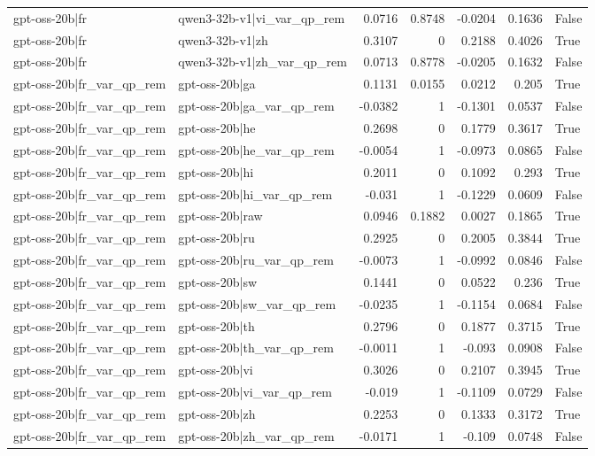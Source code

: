 \begin{table}
\begin{tabular}{l l r r r r l}
gpt-oss-20b|fr & qwen3-32b-v1|vi_var_qp_rem & 0.0716 & 0.8748 & -0.0204 & 0.1636 & False \\
gpt-oss-20b|fr & qwen3-32b-v1|zh & 0.3107 & 0 & 0.2188 & 0.4026 & True \\
gpt-oss-20b|fr & qwen3-32b-v1|zh_var_qp_rem & 0.0713 & 0.8778 & -0.0205 & 0.1632 & False \\
gpt-oss-20b|fr_var_qp_rem & gpt-oss-20b|ga & 0.1131 & 0.0155 & 0.0212 & 0.205 & True \\
gpt-oss-20b|fr_var_qp_rem & gpt-oss-20b|ga_var_qp_rem & -0.0382 & 1 & -0.1301 & 0.0537 & False \\
gpt-oss-20b|fr_var_qp_rem & gpt-oss-20b|he & 0.2698 & 0 & 0.1779 & 0.3617 & True \\
gpt-oss-20b|fr_var_qp_rem & gpt-oss-20b|he_var_qp_rem & -0.0054 & 1 & -0.0973 & 0.0865 & False \\
gpt-oss-20b|fr_var_qp_rem & gpt-oss-20b|hi & 0.2011 & 0 & 0.1092 & 0.293 & True \\
gpt-oss-20b|fr_var_qp_rem & gpt-oss-20b|hi_var_qp_rem & -0.031 & 1 & -0.1229 & 0.0609 & False \\
gpt-oss-20b|fr_var_qp_rem & gpt-oss-20b|raw & 0.0946 & 0.1882 & 0.0027 & 0.1865 & True \\
gpt-oss-20b|fr_var_qp_rem & gpt-oss-20b|ru & 0.2925 & 0 & 0.2005 & 0.3844 & True \\
gpt-oss-20b|fr_var_qp_rem & gpt-oss-20b|ru_var_qp_rem & -0.0073 & 1 & -0.0992 & 0.0846 & False \\
gpt-oss-20b|fr_var_qp_rem & gpt-oss-20b|sw & 0.1441 & 0 & 0.0522 & 0.236 & True \\
gpt-oss-20b|fr_var_qp_rem & gpt-oss-20b|sw_var_qp_rem & -0.0235 & 1 & -0.1154 & 0.0684 & False \\
gpt-oss-20b|fr_var_qp_rem & gpt-oss-20b|th & 0.2796 & 0 & 0.1877 & 0.3715 & True \\
gpt-oss-20b|fr_var_qp_rem & gpt-oss-20b|th_var_qp_rem & -0.0011 & 1 & -0.093 & 0.0908 & False \\
gpt-oss-20b|fr_var_qp_rem & gpt-oss-20b|vi & 0.3026 & 0 & 0.2107 & 0.3945 & True \\
gpt-oss-20b|fr_var_qp_rem & gpt-oss-20b|vi_var_qp_rem & -0.019 & 1 & -0.1109 & 0.0729 & False \\
gpt-oss-20b|fr_var_qp_rem & gpt-oss-20b|zh & 0.2253 & 0 & 0.1333 & 0.3172 & True \\
gpt-oss-20b|fr_var_qp_rem & gpt-oss-20b|zh_var_qp_rem & -0.0171 & 1 & -0.109 & 0.0748 & False \\

\end{tabular}
\end{table}
